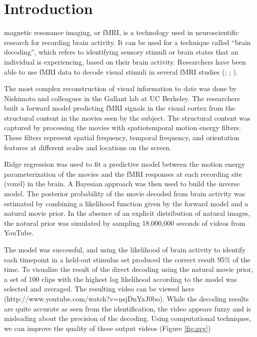
\section{Introduction}
 magnetic resonance imaging, or fMRI, is a technology used in neuroscientific research for recording brain activity. It can be used for a technique called ``brain decoding'', which refers to identifying sensory stimuli or brain states that an individual is experiencing, based on their brain activity. Researchers have been able to use fMRI data to decode visual stimuli in several fMRI studies (\cite{Kamitani}; \cite{Naselaris}; \cite{Nishimoto}).

The most complex reconstruction of visual information to date was done by Nishimoto and colleagues in the Gallant lab at UC Berkeley. The researchers built a forward model predicting fMRI signals in the visual cortex from the structural content in the movies seen by the subject. The structural content was captured by processing the movies with spatiotemporal motion energy filters. These filters represent spatial frequency, temporal frequency, and orientation features at different scales and locations on the screen. 

Ridge regression was used to fit a predictive model between the motion energy parameterization of the movies and the fMRI responses at each recording site (voxel) in the brain. A Bayesian approach was then used to build the inverse model. The posterior probability of the movie decoded from brain activity was estimated by combining a likelihood function given by the forward model and a natural movie prior. In the absence of an explicit distribution of natural images, the natural prior was simulated by sampling 18,000,000 seconds of videos from YouTube.

The model was successful, and using the likelihood of brain activity to identify each timepoint in a held-out stimulus set produced the correct result 95\% of the time. To visualize the result of the direct decoding using the natural movie prior, a set of 100 clips with the highest log likelihood according to the model was selected and averaged. The resulting video can be viewed here (http://www.youtube.com/watch?v=nsjDnYxJ0bo). While the decoding results are quite accurate as seen from the identification, the video appears fuzzy and is misleading about the precision of the decoding. Using computational techniques, we can improve the quality of these output videos (Figure \ref{fig:avg})


